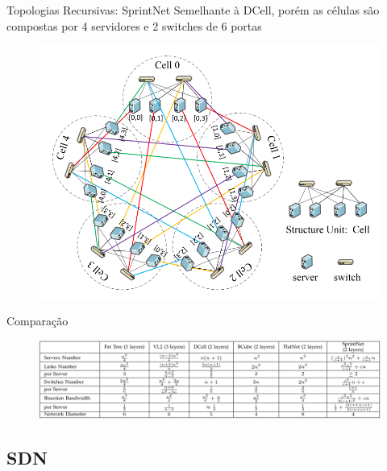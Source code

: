 \documentclass[aspectratio=169]{beamer}
\begin{document}
	\begin{frame} {Topologias Recursivas: SprintNet}
		Semelhante à DCell, porém as células são compostas por 4 servidores e 2 switches de 6 portas
		\begin{figure}[ht]    
			\includegraphics[scale=0.3]{imagens/springnet.png}
			\label{fig:sample_figure}
		\end{figure}
	\end{frame}

	\begin{frame} {Comparação}
		\begin{figure}[ht]   
			\includegraphics[scale=0.35]{imagens/tabela.png}
			\label{fig:sample_figure}
		\end{figure}
	\end{frame}

	\subsection{SDN}
		
\end{document}
